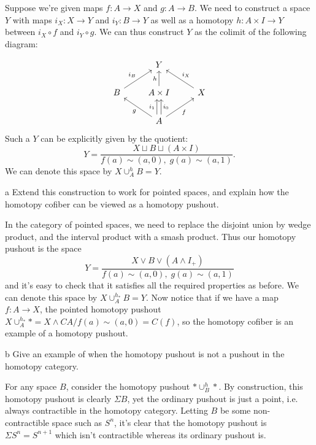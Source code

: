 \documentclass[11pt,letterpaper]{article}
\begin{document}
\begin{solution}
    \quad Suppose we're given maps $f : A\to X$ and $g: A \to B$. We need to construct a space $Y$ with maps $i_X : X \to Y$ and $i_Y : B \to Y$ as well as a homotopy $h : A\times I \to Y$ between $i_X \circ f$ and $i_Y \circ g$. We can thus construct $Y$ as the colimit of the following diagram: 

    \[\begin{tikzcd}[ampersand replacement=\&]
        \& Y \\
        B \& {A\times I} \& X \\
        \& A
        \arrow["f"', from=3-2, to=2-3]
        \arrow["g", from=3-2, to=2-1]
        \arrow["{i_1}", shift left=1, from=3-2, to=2-2]
        \arrow["{i_0}"', shift right=1, from=3-2, to=2-2]
        \arrow["{i_B}", from=2-1, to=1-2]
        \arrow["{i_X}"', from=2-3, to=1-2]
        \arrow["h", from=2-2, to=1-2]
    \end{tikzcd}\]
    Such a $Y$ can be explicitly given by the quotient:
    \[
        Y = \frac{X\sqcup B\sqcup (A\times I)}{f(a)\sim (a,0),\; g(a)\sim(a,1)}
    .\] 
    We can denote this space by $X\cup^h_A B = Y$. 

    \begin{partproblem}{a}
        Extend this construction to work for pointed spaces, and explain how the homotopy cofiber can be viewed as a homotopy pushout.
    \end{partproblem}
    \quad In the category of pointed spaces, we need to replace the disjoint union by wedge product, and the interval product with a smash product. Thus our homotopy pushout is the space
    \[
        Y = \frac{X\vee B\vee (A\wedge I_+)}{f(a)\sim (a,0),\; g(a)\sim(a,1)}
    \]
    and it's easy to check that it satisfies all the required properties as before. We can denote this space by $X\cup^{h_*}_A B=Y$. Now notice that if we have a map $f : A \to X$, the pointed homotopy pushout $X\cup_A^{h_*} * = X\wedge CA / f(a) \sim (a,0) = C(f)$, so the homotopy cofiber is an example of a homotopy pushout. 

    \begin{partproblem}{b}
        Give an example of when the homotopy pushout is not a pushout in the homotopy category.
    \end{partproblem}

    \quad For any space $B$, consider the homotopy pushout $*\cup^h_B *$. By construction, this homotopy pushout is clearly $\Sigma B$, yet the ordinary pushout is just a point, i.e. always contractible in the homotopy category. Letting $B$ be some non-contractible space such as $S^n$, it's clear that the homotopy pushout is $\Sigma S^n = S^{n+1}$ which isn't contractible whereas its ordinary pushout is.
\end{solution}
\end{document}
